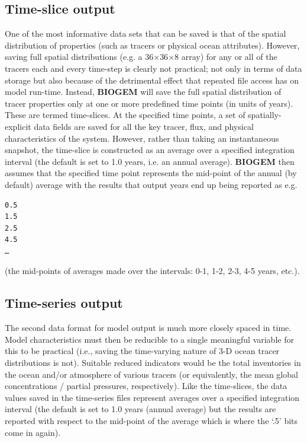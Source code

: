 \documentclass[11pt,fleqn]{book} %
\begin{document}

\subsection{Time-slice output}

One of the most informative data sets that can be saved is that of the spatial distribution of properties (such as tracers or physical ocean attributes). However, saving full spatial distributions (e.g. a 36\(\times\)36\(\times\)8 array) for any or all of the tracers each and every time-step is clearly not practical; not only in terms of data storage but also because of the detrimental effect that repeated file access has on model run-time.
Instead, \textbf{BIOGEM} will save the full spatial distribution of tracer properties only at one or more predefined time points (in units of years). These are termed time-slices. At the specified time points, a set of spatially-explicit data fields are saved for all the key tracer, flux, and physical characteristics of the system. However, rather than taking an instantaneous snapshot, the time-slice is constructed as an average over a specified integration interval (the default is set to 1.0 years, i.e. an annual average). \textbf{BIOGEM} then assumes that the specified time point represents the mid-point of the annual (by default) average with the results that output years end up being reported as e.g.
\begin{verbatim}
0.5
1.5
2.5 
4.5
…
\end{verbatim}
(the mid-points of averages made over the intervals: 0-1, 1-2, 2-3, 4-5 years, etc.).


\subsection{Time-series output}

The second data format for model output is much more closely spaced in time. Model characteristics must then be reducible to a single meaningful variable for this to be practical (i.e., saving the time-varying nature of 3-D ocean tracer distributions is not). Suitable reduced indicators would be the total inventories in the ocean and/or atmosphere of various tracers (or equivalently, the mean global concentrations / partial pressures, respectively). Like the time-slices, the data values saved in the time-series files represent averages over a specified integration interval (the default is set to 1.0 years (annual average) but the results are reported with respect to the mid-point of the average which is where the ‘.5’ bits come in again).
\end{document}
